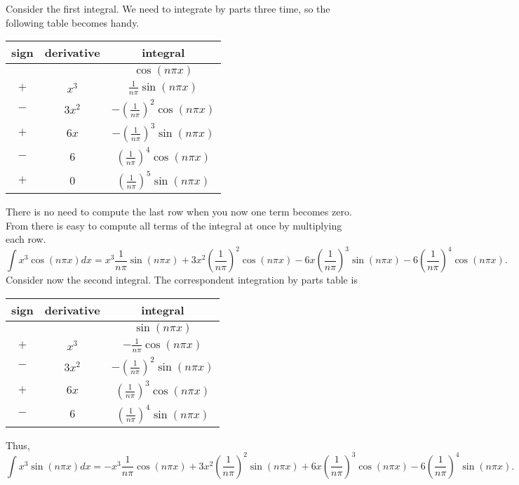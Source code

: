 \documentclass[11pt]{article}
\begin{document}
\begin{solution}
Consider the first integral. We need to integrate by parts three time, so the following table becomes handy.
\begin{center}
\begin{tabular}{c|c|c}
sign & derivative & integral \\
\hline
 &          & $ \cos(n\pi x)$ \\
$+$ & $x^{3}$  & $ \frac{1}{n \pi} \sin(n\pi x)$ \\
$-$ & $3x^{2}$ & $-\left( \frac{1}{n \pi} \right)^{2} \cos(n\pi x)$ \\
$+$ & $6x$     & $-\left( \frac{1}{n \pi} \right)^{3} \sin(n\pi x)$ \\
$-$ & $6$      & $ \left( \frac{1}{n \pi} \right)^{4} \cos(n\pi x)$ \\
$+$ & $0$      & $ \left( \frac{1}{n \pi} \right)^{5} \sin(n\pi x)$
\end{tabular}
\end{center}
There is no need to compute the last row when you now one term becomes zero. From there is easy to compute all terms of the integral at once by multiplying each row.
\[ \boxed{\int x^{3}\cos(n\pi x)dx = x^{3}\frac{1}{n\pi}\sin(n \pi x) + 3x^{2}\left( \frac{1}{n \pi} \right)^{2} \cos(n\pi x) - 6x\left( \frac{1}{n \pi} \right)^{3} \sin(n\pi x) - 6\left( \frac{1}{n \pi} \right)^{4} \cos(n\pi x)}.\]
Consider now the second integral. The correspondent integration by parts table is
\begin{center}
\begin{tabular}{c|c|c}
sign & derivative & integral \\
\hline
  &          & $ \sin(n\pi x)$ \\
$+$ & $x^{3}$  & $-\frac{1}{n \pi} \cos(n\pi x)$ \\
$-$ & $3x^{2}$ & $-\left( \frac{1}{n \pi} \right)^{2} \sin(n\pi x)$ \\
$+$ & $6x$     & $ \left( \frac{1}{n \pi} \right)^{3} \cos(n\pi x)$ \\
$-$ & $6$      & $ \left( \frac{1}{n \pi} \right)^{4} \sin(n\pi x)$
\end{tabular}
\end{center}
Thus, 
\[\boxed{\int x^{3}\sin(n\pi x)dx = - x^{3}\frac{1}{n \pi} \cos(n\pi x) + 3x^{2}\left( \frac{1}{n \pi} \right)^{2} \sin(n\pi x) + 6x \left( \frac{1}{n \pi} \right)^{3} \cos(n\pi x) - 6\left( \frac{1}{n \pi} \right)^{4} \sin(n\pi x)}.\]


\end{solution}
\end{document}
